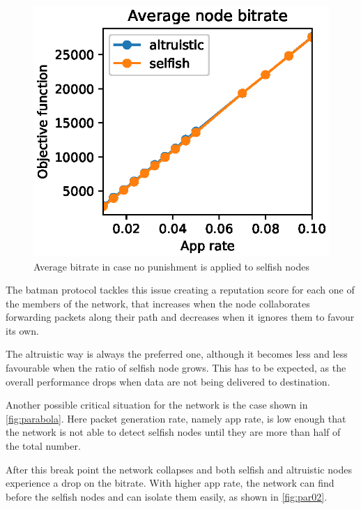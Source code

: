 \documentclass[conference,10.5pt]{IEEEtran}
\begin{document}
\begin{figure}[h]
  \includegraphics{figures/obj_func_vs_app_rate_no_punish.eps}
  \caption{Average bitrate in case no punishment is applied to selfish nodes}
  \label{fig:no-blame-app-rate}
\end{figure}

The \gls{batman} protocol tackles this issue creating a reputation score for each one of the members of the network, that increases when the node collaborates forwarding packets along their path and decreases when it ignores them to favour its own.

The altruistic way is always the preferred one, although it becomes less and less favourable when the ratio of selfish node grows. This has to be expected, as the overall performance drops when data are not being delivered to destination.


Another possible critical situation for the network is the case shown in \autoref{fig:parabola}. Here packet generation rate, namely app rate, is low enough that the network is not able to detect selfish nodes until they are more than half of the total number.

After this break point the network collapses and both selfish and altruistic nodes experience a drop on the bitrate. With higher app rate, the network can find before the selfish nodes and can isolate them easily, as shown in \autoref{fig:par02}.
\end{document}
